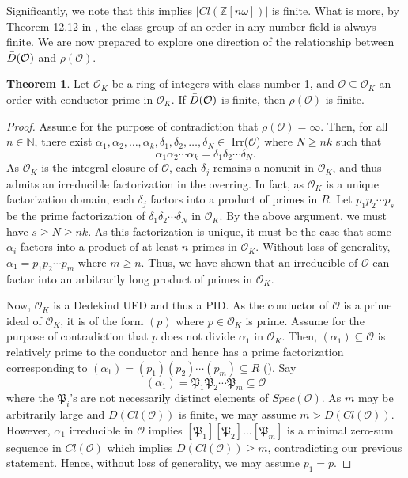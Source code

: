 \documentclass{amsart}
\theoremstyle{definition}
\newtheorem{thm}[lem]{Theorem}
\newcommand{\MO}{\mathcal{O}}
\newcommand{\bbz}{\mathbb{Z}}
\newcommand{\bbn}{\mathbb{N}}
\renewcommand{\geq}{\geqslant}
\numberwithin{equation}{section}
\begin{document}
Significantly, we note that this implies $|Cl(\bbz[n\omega])|$ is finite. What is more, by Theorem 12.12 in \cite{neukirch2013algebraic}, the class group of an order in any number field is always finite. We are now prepared to explore one direction of the relationship between $\Bar{D}(\MO)$ and $\rho(\MO)$.

\begin{thm}
    Let $\MO_K$ be a ring of integers with class number 1, and $\mathcal{O} \subseteq \MO_K$ an order with conductor prime in $\MO_K$. If $\Bar{D}(\mathcal{O})$ is finite, then $\rho(\mathcal{O})$ is finite.
\end{thm}

\begin{proof}
    Assume for the purpose of contradiction that $\rho(\mathcal{O}) = \infty$. Then, for all $n \in \bbn$, there exist $\alpha_1, \alpha_2, \dots, \alpha_k, \delta_1, \delta_2, \dots, \delta_N \in$ Irr($\mathcal{O}$) where $N \geq nk$ such that  
    \[ 
    \alpha_1 \alpha_2 \dotsm \alpha_k = \delta_1 \delta_2 \dotsm \delta_N .
    \]
    As $\MO_K$ is the integral closure of $\mathcal{O}$, each $\delta_j$ remains a nonunit in $\MO_K$, and thus admits an irreducible factorization in the overring. In fact, as $\MO_K$ is a unique factorization domain, each $\delta_j$ factors into a product of primes in $R$. Let $p_1 p_2 \dotsm p_s$ be the prime factorization of $\delta_1 \delta_2 \dotsm \delta_N$ in $\MO_K$. By the above argument, we must have $s \geq N \geq nk$. As this factorization is unique, it must be the case that some $\alpha_i$ factors into a product of at least $n$ primes in $\MO_K$. Without loss of generality, $\alpha_1 = p_1 p_2 \cdots p_m$ where $m \geq n$. Thus, we have shown that an irreducible of $\mathcal{O}$ can factor into an arbitrarily long product of primes in $\MO_K$.

    Now, $\MO_K$ is a Dedekind UFD  and thus a PID. As the conductor of $\mathcal{O}$ is a prime ideal of $\MO_K$, it is of the form $(p)$ where $p \in \MO_K$ is prime. Assume for the purpose of contradiction that $p$ does not divide $\alpha_1$ in $\MO_K$. Then, $(\alpha_1) \subseteq \mathcal{O}$ is relatively prime to the conductor and hence has a prime factorization corresponding to $(\alpha_1) =(p_1)(p_2)\dotsm (p_m) \subseteq R$ (\cite{cox2022primes}). Say
    \[
    (\alpha_1) = \mathfrak{P}_1 \mathfrak{P}_2\dotsm \mathfrak{P}_m \subseteq \mathcal{O}
    \]
    where the $\mathfrak{P}_i$'s are not necessarily distinct elements of $Spec(\mathcal{O})$. As $m$ may be arbitrarily large and $D(Cl(\MO))$ is finite, we may assume $m >  D(Cl(\MO))$. However, $\alpha_1$ irreducible in $\mathcal{O}$ implies $[\mathfrak{P}_1][\mathfrak{P}_2] \dots [\mathfrak{P}_m]$ is a minimal zero-sum sequence in $Cl(\MO)$ which implies $D(Cl(\MO)) \geq m$, contradicting our previous statement. Hence, without loss of generality, we may assume $p_1 = p$. 


\end{proof}
\end{document}
